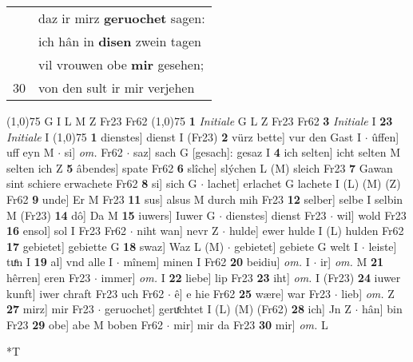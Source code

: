 \documentclass[8pt,a4paper,notitlepage]{article}
\begin{document}
\begin{table}[ht]
\begin{minipage}[t]{0.5\linewidth}
\begin{tabular}{rl}
 & daz ir mirz \textbf{geruochet} sagen:\\ 
 & ich hân in \textbf{disen} zwein tagen\\ 
 & vil vrouwen obe \textbf{mir} gesehen;\\ 
30 & von den sult ir mir verjehen\\ 
\end{tabular}
\scriptsize
\line(1,0){75} \newline
G I L M Z Fr23 Fr62 \newline
\line(1,0){75} \newline
\textbf{1} \textit{Initiale} G L Z Fr23 Fr62  \textbf{3} \textit{Initiale} I  \textbf{23} \textit{Initiale} I  \newline
\line(1,0){75} \newline
\textbf{1} dienstes] dienst I (Fr23) \textbf{2} vürz bette] vur den Gast I  $\cdot$ ûffen] uff eyn M  $\cdot$ si] \textit{om.} Fr62  $\cdot$ saz] sach G [gesach]: gesaz I \textbf{4} ich selten] icht selten M selten ich Z \textbf{5} âbendes] spate Fr62 \textbf{6} slîche] slýchen L (M) sleich Fr23 \textbf{7} Gawan sint schiere erwachete Fr62 \textbf{8} si] sich G  $\cdot$ lachet] erlachet G lachete I (L) (M) (Z) Fr62 \textbf{9} unde] Er M Fr23 \textbf{11} sus] alsus M durch mih Fr23 \textbf{12} selber] selbe I selbin M (Fr23) \textbf{14} dô] Da M \textbf{15} iuwers] Iuwer G  $\cdot$ dienstes] dienst Fr23  $\cdot$ wil] wold Fr23 \textbf{16} ensol] sol I Fr23 Fr62  $\cdot$ niht wan] nevr Z  $\cdot$ hulde] ewer hulde I (L) hulden Fr62 \textbf{17} gebietet] gebiette G \textbf{18} swaz] Waz L (M)  $\cdot$ gebietet] gebiete G welt I  $\cdot$ leiste] tuͤn I \textbf{19} al] vnd alle I  $\cdot$ mînem] minen I Fr62 \textbf{20} beidiu] \textit{om.} I  $\cdot$ ir] \textit{om.} M \textbf{21} hêrren] eren Fr23  $\cdot$ immer] \textit{om.} I \textbf{22} liebe] lip Fr23 \textbf{23} iht] \textit{om.} I (Fr23) \textbf{24} iuwer kunft] iwer chraft Fr23 uch Fr62  $\cdot$ ê] e hie Fr62 \textbf{25} wære] war Fr23  $\cdot$ lieb] \textit{om.} Z \textbf{27} mirz] mir Fr23  $\cdot$ geruochet] geruͤchtet I (L) (M) (Fr62) \textbf{28} ich] Jn Z  $\cdot$ hân] bin Fr23 \textbf{29} obe] abe M boben Fr62  $\cdot$ mir] mir da Fr23 \textbf{30} mir] \textit{om.} L \newline
\end{minipage}
\hspace{0.5cm}
\begin{minipage}[t]{0.5\linewidth}
\small
\begin{center}*T
\end{center}

\end{minipage}
\end{table}
\end{document}

